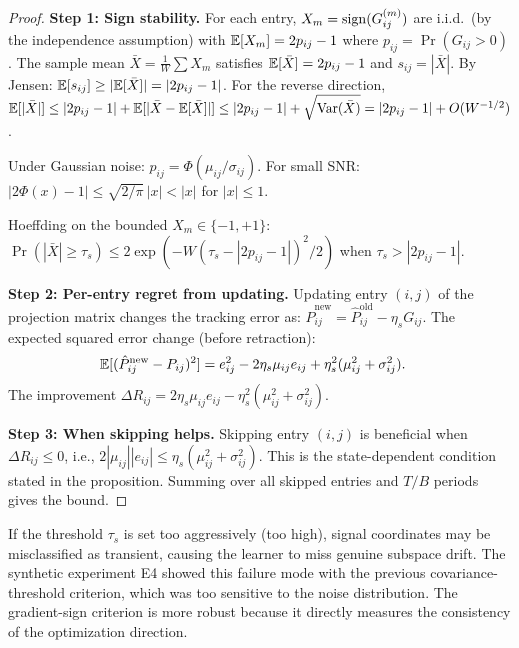 \begin{proof}
\textbf{Step 1: Sign stability.}
For each entry, $X_m = \mathrm{sign}(G_{ij}^{(m)})$ are i.i.d.\ (by the
independence assumption) with $\mathbb{E}[X_m] = 2p_{ij} - 1$ where
$p_{ij} = \Pr(G_{ij} > 0)$.
The sample mean $\bar{X} = \frac{1}{W}\sum X_m$ satisfies
$\mathbb{E}[\bar{X}] = 2p_{ij}-1$ and
$s_{ij} = |\bar{X}|$. By Jensen: $\mathbb{E}[s_{ij}] \geq |\mathbb{E}[\bar{X}]|
= |2p_{ij}-1|$. For the reverse direction, $\mathbb{E}[|\bar{X}|]
\leq |2p_{ij}-1| + \mathbb{E}[|\bar{X} - \mathbb{E}[\bar{X}]|]
\leq |2p_{ij}-1| + \sqrt{\mathrm{Var}(\bar{X})}
= |2p_{ij}-1| + O(W^{-1/2})$.

Under Gaussian noise: $p_{ij} = \Phi(\mu_{ij}/\sigma_{ij})$.
For small SNR: $|2\Phi(x)-1| \leq \sqrt{2/\pi}\,|x| < |x|$ for $|x| \leq 1$.

Hoeffding on the bounded $X_m \in \{-1,+1\}$:
$\Pr(|\bar{X}| \geq \tau_s)
\leq 2\exp(-W(\tau_s-|2p_{ij}-1|)^2/2)$ when $\tau_s > |2p_{ij}-1|$.

\textbf{Step 2: Per-entry regret from updating.}
Updating entry $(i,j)$ of the projection matrix changes the
tracking error as:
$\hat{P}_{ij}^{\mathrm{new}} = \hat{P}_{ij}^{\mathrm{old}} - \eta_s G_{ij}$.
The expected squared error change (before retraction):
\begin{align*}
  \mathbb{E}[(\hat{P}_{ij}^{\mathrm{new}} - P_{ij})^2]
  &= e_{ij}^2 - 2\eta_s\mu_{ij}e_{ij} + \eta_s^2(\mu_{ij}^2+\sigma_{ij}^2).
\end{align*}
The improvement $\Delta R_{ij} = 2\eta_s\mu_{ij}e_{ij}
- \eta_s^2(\mu_{ij}^2+\sigma_{ij}^2)$.

\textbf{Step 3: When skipping helps.}
Skipping entry $(i,j)$ is beneficial when $\Delta R_{ij} \leq 0$, i.e.,
$2|\mu_{ij}||e_{ij}| \leq \eta_s(\mu_{ij}^2+\sigma_{ij}^2)$.
This is the state-dependent condition stated in the proposition.
Summing over all skipped entries and $T/B$ periods gives the bound.
\end{proof}

\begin{remark}
\label{rem:selective-fail}
If the threshold $\tau_s$ is set too aggressively (too high), signal
coordinates may be misclassified as transient, causing the learner to
miss genuine subspace drift. The synthetic experiment E4 showed this
failure mode with the previous covariance-threshold criterion, which
was too sensitive to the noise distribution.
The gradient-sign criterion is more robust because it directly measures
the consistency of the optimization direction.
\end{remark}
